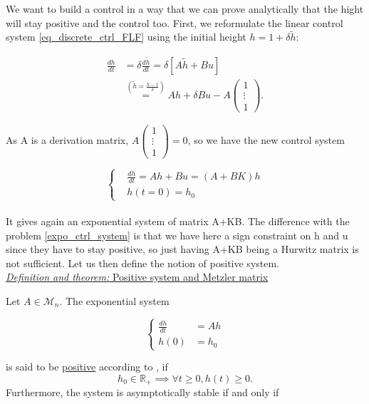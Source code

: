 \documentclass[12pt]{article}
\begin{document}
We want to build a control in a way that we can prove analytically that the hight will stay positive and the control too. First, we reformulate the linear control system \eqref{eq_discrete_ctrl_FLF} using the initial height $h = 1 + \delta \tilde{h}$:

\begin{align}
    \frac{dh}{dt} &= \delta\frac{d\tilde{h}}{dt} = \delta \left[ A\tilde{h} + Bu\right] \\
    &\stackrel{(\tilde{h}=\frac{h-1}{\delta})}{=} Ah + \delta Bu - A \begin{pmatrix}
        1 \\ \vdots \\ 1
    \end{pmatrix} .
\end{align}

As A is a derivation matrix, 
$A \begin{pmatrix}
        1 \\ \vdots \\ 1
\end{pmatrix} =0$, so we have the new control system

\begin{equation}\label{pos_ctrl_system}
\left\{
\begin{aligned}
    &\frac{dh}{dt} = Ah+Bu = (A+BK)h\\
    &h(t=0) = h_0
\end{aligned}
\right. 
\end{equation}
\\

It gives again an exponential system of matrix A+KB. The difference with the problem \eqref{expo_ctrl_system} is that we have here a sign constraint on h and u since they have to stay positive, so just having A+KB being a Hurwitz matrix is not sufficient. Let us then define the notion of positive system.
\\

\underline{\textit{Definition and theorem:} Positive system and Metzler matrix}

Let $A \in \mathcal{M}_n.$ The exponential system 

\begin{equation}
\left\{
\begin{aligned}
\frac{dh}{dt}&= Ah\\
h(0) &= h_0 
\end{aligned}
\right.
\end{equation}

is said to be \underline{positive} according to \cite{pos_ctrl_paper}, if 
\begin{equation}
    h_0 \in \mathbb{R}_+ \implies \forall t \geq 0, h(t) \geq 0.
\end{equation}
Furthermore, the system is asymptotically stable if and only if 
\end{document}
